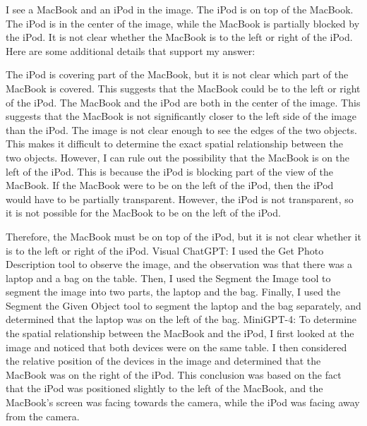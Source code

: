 \begin{enumerate}
    I see a MacBook and an iPod in the image.
    The iPod is on top of the MacBook.
    The iPod is in the center of the image, while the MacBook is partially blocked by the iPod.
    It is not clear whether the MacBook is to the left or right of the iPod.
    Here are some additional details that support my answer:
    
    The iPod is covering part of the MacBook, but it is not clear which part of the MacBook is covered. This suggests that the MacBook could be to the left or right of the iPod.
    The MacBook and the iPod are both in the center of the image. This suggests that the MacBook is not significantly closer to the left side of the image than the iPod.
    The image is not clear enough to see the edges of the two objects. This makes it difficult to determine the exact spatial relationship between the two objects.
    However, I can rule out the possibility that the MacBook is on the left of the iPod. This is because the iPod is blocking part of the view of the MacBook. If the MacBook were to be on the left of the iPod, then the iPod would have to be partially transparent. However, the iPod is not transparent, so it is not possible for the MacBook to be on the left of the iPod.
    
    Therefore, the MacBook must be on top of the iPod, but it is not clear whether it is to the left or right of the iPod.
    \subitem Visual ChatGPT: I used the Get Photo Description tool to observe the image, and the observation was that there was a laptop and a bag on the table. Then, I used the Segment the Image tool to segment the image into two parts, the laptop and the bag. Finally, I used the Segment the Given Object tool to segment the laptop and the bag separately, and determined that the laptop was on the left of the bag.
    \subitem MiniGPT-4: To determine the spatial relationship between the MacBook and the iPod, I first looked at the image and noticed that both devices were on the same table. I then considered the relative position of the devices in the image and determined that the MacBook was on the right of the iPod. This conclusion was based on the fact that the iPod was positioned slightly to the left of the MacBook, and the MacBook’s screen was facing towards the camera, while the iPod was facing away from the camera.
\end{enumerate}
